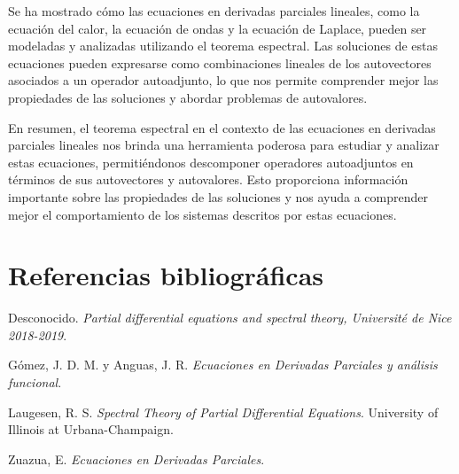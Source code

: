\documentclass{article}
\begin{document}
Se ha mostrado cómo las ecuaciones en derivadas parciales lineales, como la ecuación del calor, la ecuación de ondas y la ecuación de Laplace, pueden ser modeladas y analizadas utilizando el teorema espectral. Las soluciones de estas ecuaciones pueden expresarse como combinaciones lineales de los autovectores asociados a un operador autoadjunto, lo que nos permite comprender mejor las propiedades de las soluciones y abordar problemas de autovalores.

En resumen, el teorema espectral en el contexto de las ecuaciones en derivadas parciales lineales nos brinda una herramienta poderosa para estudiar y analizar estas ecuaciones, permitiéndonos descomponer operadores autoadjuntos en términos de sus autovectores y autovalores. Esto proporciona información importante sobre las propiedades de las soluciones y nos ayuda a comprender mejor el comportamiento de los sistemas descritos por estas ecuaciones.



\newpage

\section{Referencias bibliográficas}

\renewcommand{\refname}{}
\begin{thebibliography}{9}

    Desconocido. \emph{Partial differential equations and spectral theory, Université de Nice 2018-2019}.
    
    Gómez, J. D. M. y Anguas, J. R. \emph{Ecuaciones en Derivadas Parciales y análisis funcional}.
    
    Laugesen, R. S. \emph{Spectral Theory of Partial Differential Equations}. University of Illinois at Urbana-Champaign.
    
    Zuazua, E. \emph{Ecuaciones en Derivadas Parciales}.
    
    \end{thebibliography}
\end{document}
